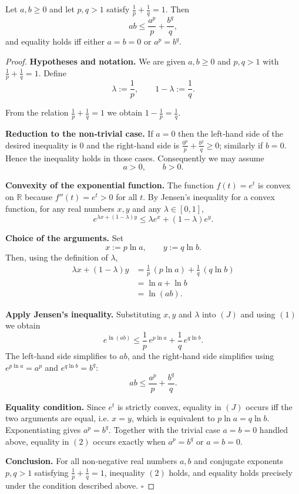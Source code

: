 \begin{theorem}
Let \(a,b\ge0\) and let \(p,q>1\) satisfy \(\frac1p+\frac1q=1\). Then
\[
ab\le\frac{a^{p}}{p}+\frac{b^{q}}{q},
\]
and equality holds iff either \(a=b=0\) or \(a^{p}=b^{q}\).
\end{theorem}

\begin{proof}
\textbf{Hypotheses and notation.}  We are given \(a,b\ge0\) and \(p,q>1\) with \(\frac1p+\frac1q=1\).  Define
\[
\lambda:=\frac1p,\qquad 1-\lambda:=\frac1q .
\]

From the relation \(\frac1p+\frac1q=1\) we obtain \(1-\frac1p=\frac1q\).

\medskip
\textbf{Reduction to the non‑trivial case.}  If \(a=0\) then the left‑hand side of the desired inequality is \(0\) and the right‑hand side is \(\frac{0^{p}}{p}+\frac{b^{q}}{q}\ge0\); similarly if \(b=0\).  Hence the inequality holds in those cases.  Consequently we may assume
\[
a>0,\qquad b>0 .
\]

\medskip
\textbf{Convexity of the exponential function.}  The function \(f(t)=e^{t}\) is convex on \(\mathbb{R}\) because \(f''(t)=e^{t}>0\) for all \(t\).  By Jensen’s inequality for a convex function, for any real numbers \(x,y\) and any \(\lambda\in[0,1]\),
\begin{equation*}
e^{\lambda x+(1-\lambda )y}\le \lambda e^{x}+(1-\lambda )e^{y}. \tag{J}
\end{equation*}

\medskip
\textbf{Choice of the arguments.}  Set
\[
x:=p\ln a,\qquad y:=q\ln b .
\]
Then, using the definition of \(\lambda\),
\begin{align*}
\lambda x+(1-\lambda )y
&=\frac1p\,(p\ln a)+\frac1q\,(q\ln b)\\
&=\ln a+\ln b\\
&=\ln (ab). \tag{1}
\end{align*}

\medskip
\textbf{Apply Jensen’s inequality.}  Substituting \(x,y\) and \(\lambda\) into \((J)\) and using \((1)\) we obtain
\[
e^{\ln(ab)}\le \frac1p\,e^{p\ln a}+\frac1q\,e^{q\ln b}.
\]
The left‑hand side simplifies to \(ab\), and the right‑hand side simplifies using \(e^{p\ln a}=a^{p}\) and \(e^{q\ln b}=b^{q}\):
\[
ab\le \frac{a^{p}}{p}+\frac{b^{q}}{q}. \tag{2}
\]

\medskip
\textbf{Equality condition.}  Since \(e^{t}\) is strictly convex, equality in \((J)\) occurs iff the two arguments are equal, i.e. \(x=y\), which is equivalent to \(p\ln a=q\ln b\).  Exponentiating gives \(a^{p}=b^{q}\).  Together with the trivial case \(a=b=0\) handled above, equality in \((2)\) occurs exactly when \(a^{p}=b^{q}\) or \(a=b=0\).

\medskip
\textbf{Conclusion.}  For all non‑negative real numbers \(a,b\) and conjugate exponents \(p,q>1\) satisfying \(\frac1p+\frac1q=1\), inequality \((2)\) holds, and equality holds precisely under the condition described above. \(\square\)
\end{proof}